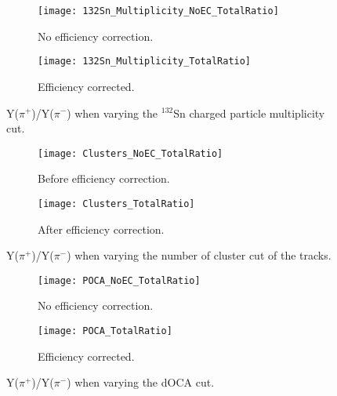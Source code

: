 \begin{figure}[!htb]
     \centering
     \begin{subfigure}[b]{\textwidth}
         \centering
         \texttt{[image: 132Sn\_Multiplicity\_NoEC\_TotalRatio]}
         \caption{No efficiency correction.}
         \label{fig:ratio_multCutVar_NoEC}
     \end{subfigure}
     \hfill
    \begin{subfigure}[b]{\textwidth}
         \centering
         \texttt{[image: 132Sn\_Multiplicity\_TotalRatio]}
         \caption{Efficiency corrected.}
         \label{fig:ratio_multCutVar}
     \end{subfigure}
     \hfill
\caption{Y($\pi^+$)/Y($\pi^-$) when varying the ${}^{132}$Sn charged particle multiplicity cut. }
\label{fig:ratio_multCutVar}
\end{figure}



\begin{figure}[!htb]
     \centering
     \begin{subfigure}[b]{\textwidth}
         \centering
         \texttt{[image: Clusters\_NoEC\_TotalRatio]}
         \caption{Before efficiency correction.}
         \label{fig:ratio_clustVar_NoEC}
     \end{subfigure}
     \hfill
    \begin{subfigure}[b]{\textwidth}
         \centering
         \texttt{[image: Clusters\_TotalRatio]}
         \caption{After efficiency correction.}
         \label{fig:ratio_clustVar_EC}
     \end{subfigure}
     \hfill
\caption{Y($\pi^+$)/Y($\pi^-$) when varying the number of cluster cut of the tracks.}
\label{fig:ratio_clustVar}
\end{figure}




\begin{figure}[!htb]
     \centering
     \begin{subfigure}[b]{\textwidth}
         \centering
         \texttt{[image: POCA\_NoEC\_TotalRatio]}
         \caption{No efficiency correction.}
         \label{fig:ratio_cutVarPOCA_NoEC}
     \end{subfigure}
     \hfill
    \begin{subfigure}[b]{\textwidth}
         \centering
         \texttt{[image: POCA\_TotalRatio]}
         \caption{Efficiency corrected.}
         \label{fig:ratio_cutVarPOCA_EC}
     \end{subfigure}
     \hfill
\caption{Y($\pi^+$)/Y($\pi^-$) when varying the dOCA cut.}
\label{fig:ratio_cutVarPOCA}
\end{figure}





